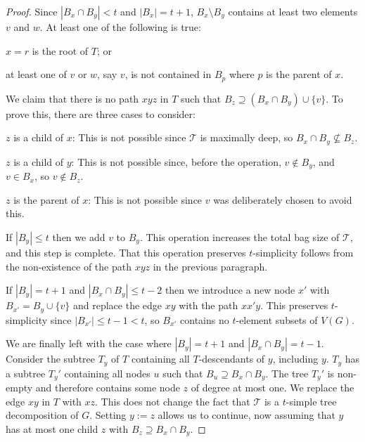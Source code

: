 \documentclass[kpfonts]{patmorin}
\theoremstyle{named}
\begin{document}
\begin{proof}
    Since $|B_x\cap B_y|< t$ and $|B_x|=t+1$, $B_x\setminus B_y$ contains at least two elements $v$ and $w$.  At least one of the following is true:
    \begin{inparaenum}[(i)]
        \item $x=r$ is the root of $T$; or
        \item at least one of $v$ or $w$, say $v$, is not contained in $B_p$ where $p$ is the parent of $x$.
    \end{inparaenum}
    We claim that there is no path $xyz$ in $T$ such that $B_z\supseteq (B_x\cap B_y)\cup\{v\}$. To prove this, there are three cases to consider:
    \begin{compactenum}
        \item $z$ is a child of $x$:  This is not possible since $\mathcal{T}$ is maximally deep, so $B_x\cap B_y\not\subseteq B_z$.
        \item $z$ is a child of $y$:  This is not possible since, before the operation, $v\not\in B_y$, and $v\in B_x$, so $v\not\in B_z$.
        \item $z$ is the parent of $x$:  This is not possible since $v$ was deliberately chosen to avoid this.
    \end{compactenum}

    If $|B_y|\le t$ then we add $v$ to $B_y$.  This operation increases the total bag size of $\mathcal{T}$, and this step is complete.  That this operation preserves $t$-simplicity follows from the non-existence of the path $xyz$ in the previous paragraph.

    If $|B_y|=t+1$ and $|B_x\cap B_y|\le t-2$ then we introduce a new node $x'$ with $B_{x'}=B_y\cup\{v\}$ and replace the edge $xy$ with the path $xx'y$.  This preserves $t$-simplicity since $|B_{x'}|\le t-1<t$, so $B_{x'}$ contains no $t$-element subsets of $V(G)$.

    We are finally left with the case where $|B_y|=t+1$ and $|B_x\cap B_y|= t-1$.  Consider the subtree $T_y$ of $T$ containing all $T$-descendants of $y$, including $y$.  $T_y$ has a subtree $T_y'$ containing all nodes $u$ such that $B_u\supseteq B_x\cap B_y$.  The tree $T_y'$ is non-empty and therefore contains some node $z$ of degree at most one.  We replace the edge $xy$ in $T$ with $xz$.  This does not change the fact that $\mathcal{T}$ is a $t$-simple tree decomposition of $G$.  Setting $y:=z$ allows us to continue, now assuming that $y$ has at most one child $z$ with $B_z\supseteq B_x\cap B_y$.


\end{proof}
\end{document}
